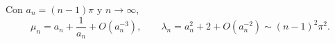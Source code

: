 Con $a_n=(n-1)\pi$ y $n\to\infty$,
\[\mu_n=a_n+\frac1{a_n}+O(a_n^{-3}),\qquad\lambda_n=a_n^2+2+O(a_n^{-2})\sim(n-1)^2\pi^2.\]
